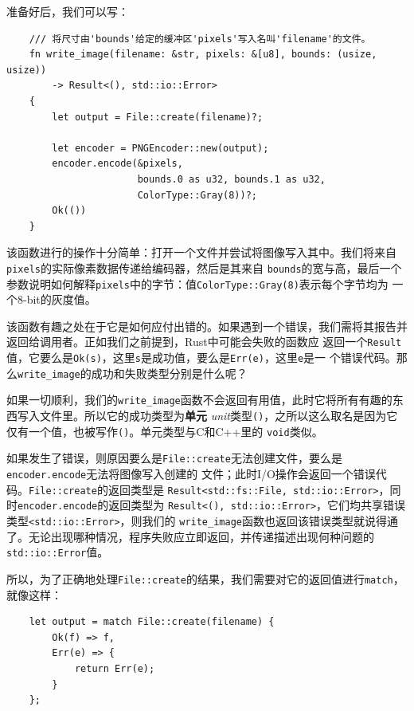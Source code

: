 \smallskip
准备好后，我们可以写：
\begin{verbatim}
    /// 将尺寸由'bounds'给定的缓冲区'pixels'写入名叫'filename'的文件。
    fn write_image(filename: &str, pixels: &[u8], bounds: (usize, usize))
        -> Result<(), std::io::Error> 
    {
        let output = File::create(filename)?;
        
        let encoder = PNGEncoder::new(output);
        encoder.encode(&pixels,
                       bounds.0 as u32, bounds.1 as u32,
                       ColorType::Gray(8))?;
        Ok(())
    }
\end{verbatim}

\smallskip
该函数进行的操作十分简单：打开一个文件并尝试将图像写入其中。我们将来自\texttt{pixels}的实际像素数据传递给编码器，然后是其来自
\texttt{bounds}的宽与高，最后一个参数说明如何解释\texttt{pixels}中的字节：值\texttt{ColorType::Gray(8)}表示每个字节均为
一个8-bit的灰度值。

\medskip
该函数有趣之处在于它是如何应付出错的。如果遇到一个错误，我们需将其报告并返回给调用者。正如我们之前提到，Rust中可能会失败的函数应
返回一个\texttt{Result}值，它要么是\texttt{Ok(s)}，这里\texttt{s}是成功值，要么是\texttt{Err(e)}，这里\texttt{e}是一
个错误代码。那么\texttt{write\_image}的成功和失败类型分别是什么呢？

\medskip
如果一切顺利，我们的\texttt{write\_image}函数不会返回有用值，此时它将所有有趣的东西写入文件里。所以它的成功类型为\textbf{单元}
\textit{unit}类型\texttt{()}，之所以这么取名是因为它仅有一个值，也被写作\texttt{()}。单元类型与C和C++里的
\texttt{void}类似。

\medskip
如果发生了错误，则原因要么是\texttt{File::create}无法创建文件，要么是\texttt{encoder.encode}无法将图像写入创建的
文件；此时I/O操作会返回一个错误代码。\texttt{File::create}的返回类型是
\texttt{Result<std::fs::File, std::io::Error>}，同时\texttt{encoder.encode}的返回类型为
\texttt{Result<(), std::io::Error>}，它们均共享错误类型\texttt{<std::io::Error>}，则我们的
\texttt{write\_image}函数也返回该错误类型就说得通了。无论出现哪种情况，程序失败应立即返回，并传递描述出现何种问题的
\texttt{std::io::Error}值。

\medskip
所以，为了正确地处理\texttt{File::create}的结果，我们需要对它的返回值进行\texttt{match}，就像这样：
\begin{verbatim}
    let output = match File::create(filename) {
        Ok(f) => f,
        Err(e) => {
            return Err(e);
        }
    };
\end{verbatim}

